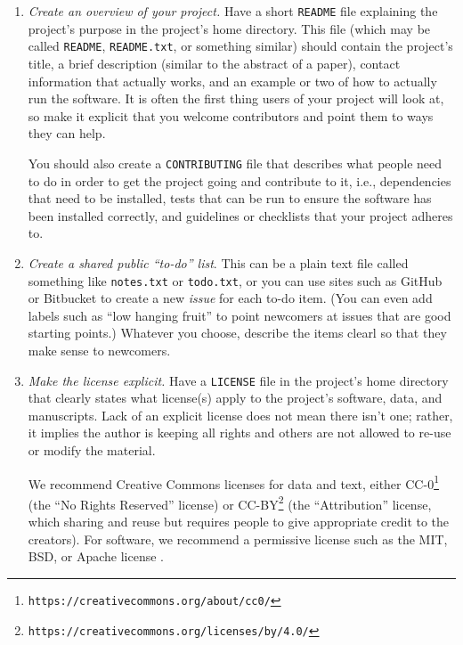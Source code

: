 \documentclass[10pt]{article}
\newcommand{\recommend}[1]{\textit{#1}}
\newcommand{\withurl}[2]{{#1}\footnote{\texttt{#2}}}
\begin{document}
\begin{enumerate}

\item
  \recommend{Create an overview of your project.}  Have a short
  \texttt{README} file explaining the project's purpose in the
  project's home directory.  This file (which may be called
  \texttt{README}, \texttt{README.txt}, or something similar) should
  contain the project's title, a brief description (similar to the
  abstract of a paper), contact information that actually works, and
  an example or two of how to actually run the software.  It is often
  the first thing users of your project will look at, so make it
  explicit that you welcome contributors and point them to ways they
  can help.
  
  You should also create a \texttt{CONTRIBUTING} file that describes
  what people need to do in order to get the project going and
  contribute to it, i.e., dependencies that need to be installed,
  tests that can be run to ensure the software has been installed
  correctly, and guidelines or checklists that your project adheres
  to.

\item
  \recommend{Create a shared public ``to-do'' list}.  This can be a
  plain text file called something like \texttt{notes.txt} or
  \texttt{todo.txt}, or you can use sites such as GitHub or Bitbucket
  to create a new \emph{issue} for each to-do item. (You can even add
  labels such as ``low hanging fruit'' to point newcomers at issues
  that are good starting points.)  Whatever you choose, describe the
  items clearl so that they make sense to newcomers.

\item
  \recommend{Make the license explicit.}  Have a \texttt{LICENSE}
  file in the project's home directory that clearly states what
  license(s) apply to the project's software, data, and
  manuscripts. Lack of an explicit license does not mean there isn't
  one; rather, it implies the author is keeping all rights and others
  are not allowed to re-use or modify the material.

  We recommend Creative Commons licenses for data and text, either
  \withurl{CC-0}{https://creativecommons.org/about/cc0/} (the ``No
  Rights Reserved'' license) or
  \withurl{CC-BY}{https://creativecommons.org/licenses/by/4.0/} (the
  ``Attribution'' license, which sharing and reuse but requires people
  to give appropriate credit to the creators).  For software, we
  recommend a permissive license such as the MIT, BSD, or Apache
  license \cite{laurent2004}.


\end{enumerate}
\end{document}
